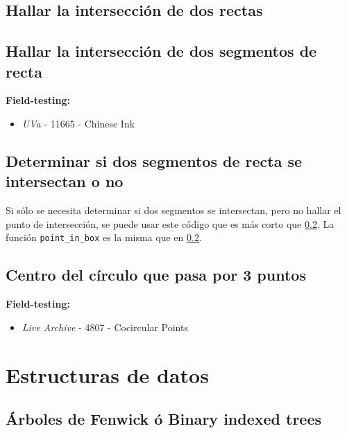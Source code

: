 \documentclass[10pt,letterpaper,twocolumn]{article}
\newcommand{\codigofuente}[1]{

\dotfill
}
\begin{document}
\subsection{Hallar la intersección de dos rectas}
\codigofuente{./src/geometria/line_line_intersection.cpp}

\subsection{Hallar la intersección de dos segmentos de recta}
\label{hallar_interseccion_segmentos}
\small
\textbf{Field-testing:}
\begin{itemize}
\item \emph{UVa} - 11665 - Chinese Ink
\end{itemize}
\normalsize

\codigofuente{./src/geometria/segment_segment_intersection.cpp}

\subsection{Determinar si dos segmentos de recta se intersectan o no}

Si sólo se necesita determinar si dos segmentos se intersectan, pero no hallar
el punto de intersección, se puede usar este código que es más corto que \ref{hallar_interseccion_segmentos}.
La función \verb!point_in_box! es la misma que en \ref{hallar_interseccion_segmentos}.

\codigofuente{./src/geometria/check_segment_intersection.cpp}

\subsection{Centro del círculo que pasa por 3 puntos}
\small
\textbf{Field-testing:}
\begin{itemize}
\item \emph{Live Archive} - 4807 - Cocircular Points
\end{itemize}
\normalsize

\codigofuente{./src/geometria/circle_through_3_points.cpp}

\section{Estructuras de datos}
\subsection{Árboles de Fenwick ó Binary indexed trees}
\end{document}
